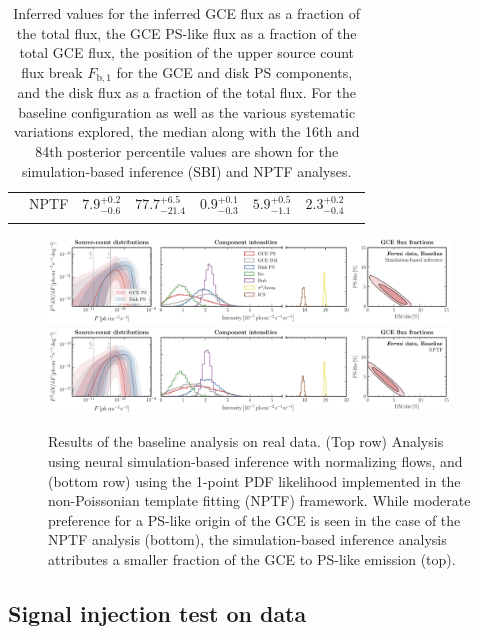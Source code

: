 \documentclass[prd,aps,10pt,nofootinbib,twocolumn,superscriptaddress,preprintnumbers,balancelastpage,longbibliography,floatfix]{revtex4-2}
\newcommand\Bstrut{\rule[-1.6ex]{0pt}{0pt}}   %
\begin{document}
\begin{table}[!t]
\begin{center}
\begin{tabular}{C{2.3cm}C{2cm}|C{2cm}C{2cm}C{2.2cm}C{2cm}C{2.2cm}C{2cm}}
& NPTF & $7.9^{+0.2}_{-0.6}$ & $77.7^{+6.5}_{-21.4}$ & $0.9^{+0.1}_{-0.3}$ & $5.9^{+0.5}_{-1.1}$ & $2.3^{+0.2}_{-0.4}$\Bstrut &\\
\botrule
\end{tabular}
\end{center}
\caption{Inferred values for the inferred GCE flux as a fraction of the total flux, the GCE PS-like flux as a fraction of the total GCE flux, the position of the upper source count flux break $F_{\mathrm{b}, 1}$ for the GCE and disk PS components, and the disk flux as a fraction of the total flux. For the baseline configuration as well as the various systematic variations explored, the median along with the 16th and 84th posterior percentile values are shown for the simulation-based inference (SBI) and NPTF analyses.}
\label{tab:results}
\end{table}    
%

%
\begin{figure}[!htbp]
\centering
\includegraphics[width=0.95\textwidth]{plots/data_fid_sbi.pdf}
\includegraphics[width=0.95\textwidth]{plots/data_fid_nptf.pdf}
\caption{Results of the baseline analysis on real \Fermi data. {(Top row)} Analysis using neural simulation-based inference with normalizing flows, and {(bottom row)} using the 1-point PDF likelihood implemented in the non-Poissonian template fitting (NPTF) framework. While moderate preference for a PS-like origin of the GCE is seen in the case of the NPTF analysis (bottom), the simulation-based inference analysis attributes a smaller fraction of the GCE to PS-like emission (top).}
\label{fig:fid_data}
\end{figure}
%

\subsection{Signal injection test on \Fermi data}
\label{sec:sig-injection}
\end{document}
